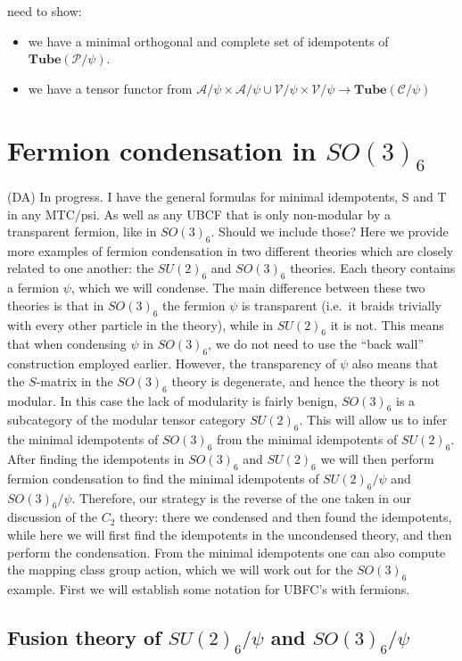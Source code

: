 \documentclass[12pt,a4paper]{article}
\newcounter{arrow}
\newcommand{\ra}{\rightarrow}
\newcommand{\mca}{\mathcal{A}}
\newcommand{\mcc}{\mathcal{C}}
\newcommand{\mcp}{\mathcal{P}}
\newcommand{\mcv}{\mathcal{V}}
\newcommand{\tube}{\textbf{Tube}}
\newcommand{\dave}[1]{{\color{ao(english)}\footnotesize{(DA) #1}}}
\begin{document}
need to show:
\begin{itemize}
\item we have a minimal orthogonal and complete set of idempotents of $\tube(\mcp/\psi)$.
\item we have a tensor functor from $\mca/\psi \times \mca/\psi \cup \mcv / \psi \times \mcv /\psi \ra \tube(\mcc/\psi)$
\end{itemize}


\section{Fermion condensation in $SO(3)_6$} \label{so36}
\dave{In progress. I have the general formulas for minimal idempotents, S and T in any MTC/psi. 
As well as any UBCF that is only non-modular by a transparent fermion, like in $SO(3)_6$.
Should we include those?}
Here we provide more examples of fermion condensation in two different theories which are closely related to one another:
the $SU(2)_6$ and $SO(3)_6$ theories. 
Each theory contains a fermion $\psi$, which we will condense. 
The main difference between these two theories is that in $SO(3)_6$ the fermion $\psi$ is transparent (i.e.\ it braids trivially with every other particle in the theory), while in $SU(2)_6$ it is not. 
This means that when condensing $\psi$ in $SO(3)_6$, we do not need to use the ``back wall'' construction employed earlier. 
However, the transparency of $\psi$ also means that the $S$-matrix in the $SO(3)_6$ theory is degenerate, and hence the theory is not modular. 
In this case the lack of modularity is fairly benign, $SO(3)_6$ is a subcategory of the modular tensor category $SU(2)_6$.
This will allow us to infer the minimal idempotents of $SO(3)_6$ from the minimal idempotents of $SU(2)_6$.
After finding the idempotents in $SO(3)_6$ and $SU(2)_6$ we will then perform fermion condensation to find the minimal idempotents of $SU(2)_6/\psi$ and $SO(3)_6/\psi$. 
Therefore, our strategy is the reverse of the one taken in our discussion of the $C_2$ theory: there we condensed and then found the idempotents, while here we will first find the idempotents in the uncondensed theory, 
and then perform the condensation.
From the minimal idempotents one can also compute the mapping class group action, which we will work out for the $SO(3)_6$ example.
First we will establish some notation for UBFC's with fermions.




\subsection{Fusion theory of $SU(2)_6/\psi$ and $SO(3)_6/\psi$}
\end{document}
